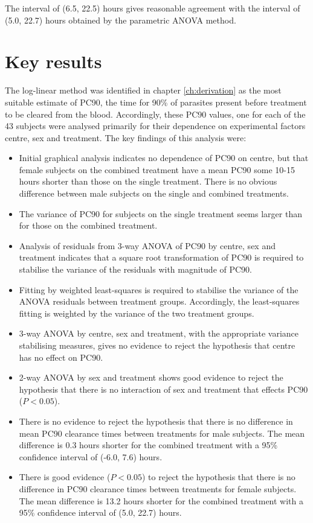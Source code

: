 The interval of (6.5, 22.5) hours gives reasonable agreement with the interval of (5.0, 22.7) hours obtained by the parametric ANOVA method.

\section{Key results}
The log-linear method was identified in chapter \ref{ch:derivation} as the most suitable estimate of PC90, the time for 90\% of parasites present before treatment to be cleared from the blood. Accordingly, these PC90 values, one for each of the 43 subjects were analysed primarily for their dependence on experimental factors centre, sex and treatment. The key findings of this analysis were:
\begin{itemize}
\item Initial graphical analysis indicates no dependence of PC90 on centre, but that female subjects on the combined treatment have a mean PC90 some 10-15 hours shorter than those on the single treatment. There is no obvious difference between male subjects on the single and combined treatments.
\item The variance of PC90 for subjects on the single treatment seems larger than for those on the combined treatment.
\item Analysis of residuals from 3-way ANOVA of PC90 by centre, sex and treatment indicates that a square root transformation of PC90 is required to stabilise the variance of the residuals with magnitude of PC90.
\item Fitting by weighted least-squares is required to stabilise the variance of the ANOVA residuals between treatment groups. Accordingly, the least-squares fitting is weighted by the variance of the two treatment groups. 
\item 3-way ANOVA by centre, sex and treatment, with the appropriate variance stabilising measures, gives no evidence to reject the hypothesis that centre has no effect on PC90.
\item 2-way ANOVA by sex and treatment shows good evidence to reject the hypothesis that there is no interaction of sex and treatment that effects PC90 ($P<0.05$).
\item There is no evidence to reject the hypothesis that there is no difference in mean PC90 clearance times between treatments for male subjects. The mean difference is 0.3 hours shorter for the combined treatment with a 95\% confidence interval of (-6.0, 7.6) hours.
\item There is good evidence ($P<0.05$) to reject the hypothesis that there is no difference in PC90 clearance times between treatments for female subjects. The mean difference is 13.2 hours shorter for the combined treatment with a 95\% confidence interval of (5.0, 22.7) hours.

\end{itemize}
